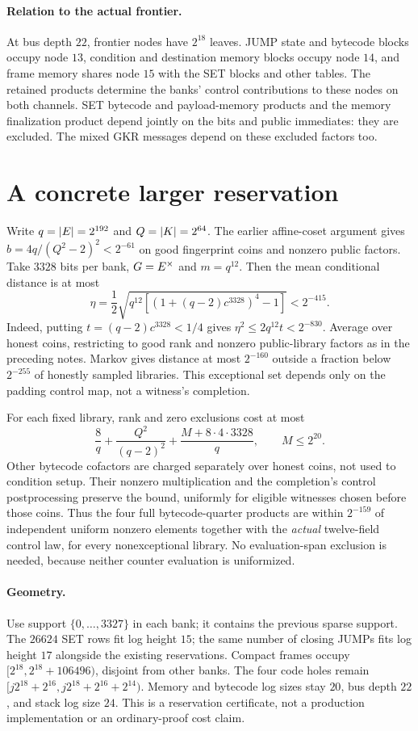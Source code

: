 \documentclass[11pt]{article}
\begin{document}
\paragraph{Relation to the actual frontier.} At bus depth $22$, frontier nodes have $2^{18}$ leaves. JUMP state and bytecode blocks occupy node $13$, condition and destination memory blocks occupy node $14$, and frame memory shares node $15$ with the SET blocks and other tables. The retained products determine the banks' control contributions to these nodes on both channels. SET bytecode and payload-memory products and the memory finalization product depend jointly on the bits and public immediates: they are excluded. The mixed GKR messages depend on these excluded factors too.

\section{A concrete larger reservation}

Write $q=|E|=2^{192}$ and $Q=|K|=2^{64}$. The earlier affine-coset argument gives $b=4q/(Q^2-2)^2<2^{-61}$ on good fingerprint coins and nonzero public factors. Take $3328$ bits per bank, $G=E^\times$ and $m=q^{12}$. Then the mean conditional distance is at most
\[
 \eta=\frac12\sqrt{q^{12}\left[(1+(q-2)c^{3328})^4-1\right]}<2^{-415}.
\]
Indeed, putting $t=(q-2)c^{3328}<1/4$ gives $\eta^2\le2q^{12}t<2^{-830}$. Average over honest coins, restricting to good rank and nonzero public-library factors as in the preceding notes. Markov gives distance at most $2^{-160}$ outside a fraction below $2^{-255}$ of honestly sampled libraries. This exceptional set depends only on the padding control map, not a witness's completion.

For each fixed library, rank and zero exclusions cost at most
\[
 \frac8q+\frac{Q^2}{(q-2)^2}+\frac{M+8\cdot4\cdot3328}{q},\qquad M\le2^{20}.
\]
Other bytecode cofactors are charged separately over honest coins, not used to condition setup. Their nonzero multiplication and the completion's control postprocessing preserve the bound, uniformly for eligible witnesses chosen before those coins. Thus the four full bytecode-quarter products are within $2^{-159}$ of independent uniform nonzero elements together with the \emph{actual} twelve-field control law, for every nonexceptional library. No evaluation-span exclusion is needed, because neither counter evaluation is uniformized.

\paragraph{Geometry.} Use support $\{0,\ldots,3327\}$ in each bank; it contains the previous sparse support. The $26624$ SET rows fit log height $15$; the same number of closing JUMPs fits log height $17$ alongside the existing reservations. Compact frames occupy $[2^{18},2^{18}+106496)$, disjoint from other banks. The four code holes remain $[j2^{18}+2^{16},j2^{18}+2^{16}+2^{14})$. Memory and bytecode log sizes stay $20$, bus depth $22$, and stack log size $24$. This is a reservation certificate, not a production implementation or an ordinary-proof cost claim.
\end{document}
